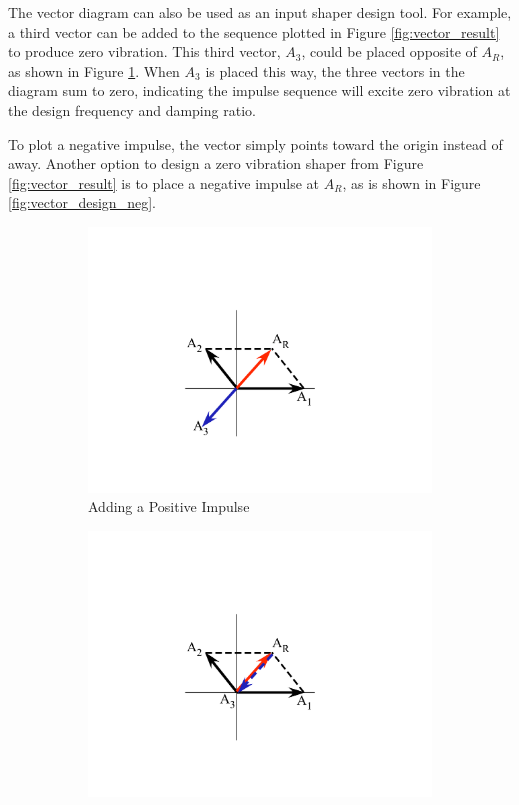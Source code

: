 The vector diagram can also be used as an input shaper design tool. For example, a third vector can be added to the sequence plotted in Figure \ref{fig:vector_result} to produce zero vibration. This third vector, $A_3$, could be placed opposite of $A_R$, as shown in Figure \ref{fig:vector_design_pos}. When $A_3$ is placed this way, the three vectors in the diagram sum to zero, indicating the impulse sequence will excite zero vibration at the design frequency and damping ratio.

To plot a negative impulse, the vector simply points toward the origin instead of away. Another option to design a zero vibration shaper from Figure \ref{fig:vector_result} is to place a negative impulse at $A_R$, as is shown in Figure \ref{fig:vector_design_neg}.
% 
\begin{figure}[tb!]
  \centering
  \begin{subfigure}[b]{0.45\textwidth}
    \centering
    \includegraphics[width=\textwidth]{Figures/Ch3/input_shaping/vector_diagram_design}
    \caption{Adding a Positive Impulse}
    \label{fig:vector_design_pos}
  \end{subfigure}
  \hfill
  \begin{subfigure}[b]{0.45\textwidth}
    \centering
    \includegraphics[width=\textwidth]{Figures/Ch3/input_shaping/vector_diagram_design_neg}

\end{subfigure}
\end{figure}
